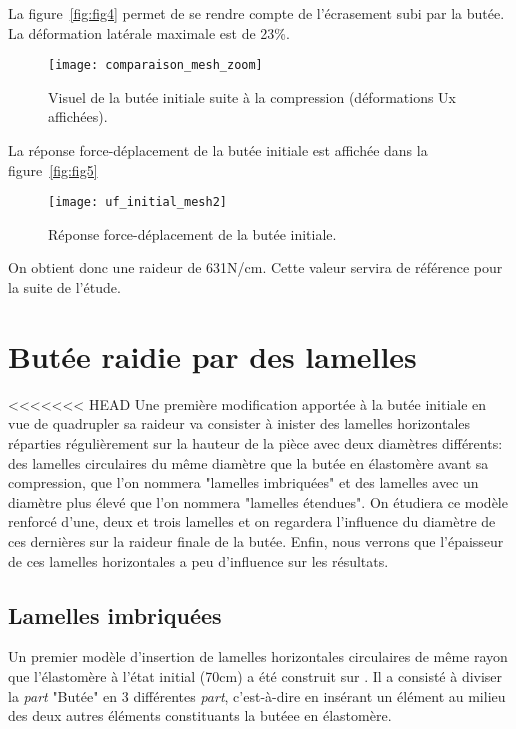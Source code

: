 ﻿ \documentclass{article}
\newcommand{\abaqus}{\bsc{Abaqus}\xspace}
\begin{document}
La figure~\ref{fig:fig4} permet de se rendre compte de l'écrasement subi par la butée. La déformation latérale maximale est de 23\%.

\begin{figure}[!h]
	\centering
	\texttt{[image: comparaison\_mesh\_zoom]}
	\caption{Visuel de la butée initiale suite à la compression (déformations Ux affichées).}
	\label{fig4}
\end{figure}

La réponse force-déplacement de la butée initiale est affichée dans la figure~\ref{fig:fig5}

\begin{figure}[!h]
	\centering
	\texttt{[image: uf\_initial\_mesh2]}
	\caption{Réponse force-déplacement de la butée initiale.}
	\label{fig5}
\end{figure}

On obtient donc une raideur de 631N/cm. Cette valeur servira de référence pour la suite de l'étude.


\section{Butée raidie par des lamelles}

<<<<<<< HEAD
Une première modification apportée à la butée initiale en vue de quadrupler sa raideur va consister à inister des lamelles horizontales réparties régulièrement sur la hauteur de la pièce avec deux diamètres différents: des lamelles circulaires du même diamètre que la butée en élastomère avant sa compression, que l'on nommera "lamelles imbriquées" et des lamelles avec un diamètre plus élevé que l'on nommera "lamelles étendues". On étudiera ce modèle renforcé d'une, deux et trois lamelles et on regardera l'influence du diamètre de ces dernières sur la raideur finale de la butée. Enfin, nous verrons que l'épaisseur de ces lamelles horizontales a peu d'influence sur les résultats.

\subsection{Lamelles imbriquées}

Un premier modèle d'insertion de lamelles horizontales circulaires de même rayon que l'élastomère à l'état initial (70cm) a été construit sur \abaqus. Il a consisté à diviser la \textit{part} "Butée" en 3 différentes \textit{part}, c'est-à-dire en insérant un élément au milieu des deux autres éléments constituants la butéee en élastomère.
\end{document}
